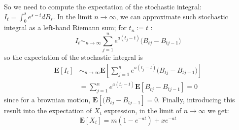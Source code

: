\documentclass[12pt]{article}
\begin{document}
So we need to compute the expectation of the stochastic integral: $I_t =\int_0^s e^{s-t}dB_s $. In the limit $n\longrightarrow \infty$, we can approximate such stochastic integral as a left-hand Riemann sum; for $t_n := t$ :
\begin{equation}
I_t \sim_{n\longrightarrow \infty} \sum_{j=1}^n e^{a(t_j-t)} \bigg(B_{tj}-B_{tj-1}\bigg)
\end{equation}
so the expectation of the stochastic integral is
\begin{align}
\mathbf{E}[I_t] &\sim_{n\longrightarrow \infty} \mathbf{E}\left[\sum_{j=1}^n e^{a(t_j-t)} \bigg(B_{tj}-B_{tj-1}\bigg)\right]  \\
&= \sum_{j=1}^n e^{a(t_j-t)} \mathbf{E}[B_{tj}-B_{tj-1}] = 0
\end{align}
since for a brownian motion, $ \mathbf{E}[(B_{tj}-B_{tj-1}] = 0$. Finally, introducing this result into the expectation of $X_t$ expression, in the limit of $n\longrightarrow \infty$ we get:
\begin{equation}\label{ext}
\boxed{\mathbf{E}[X_t] =m(1-e^{-at}) + x e^{-at} }
\end{equation}
\end{document}
